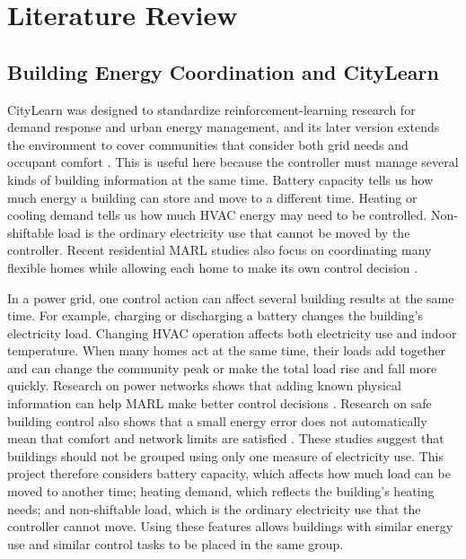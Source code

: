 \chapter{Literature Review}\label{ch:background}

\section{Building Energy Coordination and CityLearn}

CityLearn was designed to standardize reinforcement-learning research for
demand response and urban energy management, and its later version extends the
environment to cover communities that consider both grid needs and occupant
comfort \cite{citylearn2020,citylearnv2}. This is useful here because the
controller must manage several kinds of building information at the same time.
Battery capacity tells us how much energy a building can store and move to a
different time. Heating or cooling demand tells us how much HVAC energy may need
to be controlled. Non-shiftable load is the ordinary electricity use that
cannot be moved by the controller. Recent residential MARL studies also focus
on coordinating many flexible homes while allowing each home to make its own
control decision \cite{charbonnier2025,wilk2024}.


In a power grid, one control action can affect several building results at the
same time. For example, charging or discharging a battery changes the building's
electricity load. Changing HVAC
operation affects both electricity use and indoor temperature. When many homes
act at the same time, their loads add together and can change the community peak
or make the total load rise and fall more quickly. Research on power networks
shows that adding known physical information can help MARL make better control
decisions \cite{physicsMADRL2024}. Research on safe building control also shows
that a small energy error does not automatically mean that comfort and network
limits are satisfied \cite{safeDRL2025,sun2024}. These studies suggest that
buildings should not be grouped using only one measure of electricity use. This
project therefore considers battery capacity, which affects how much load can
be moved to another time; heating demand, which reflects the building's heating
needs; and non-shiftable load, which is the ordinary electricity use that the
controller cannot move. Using these features allows buildings with similar
energy use and similar control tasks to be placed in the same group.


